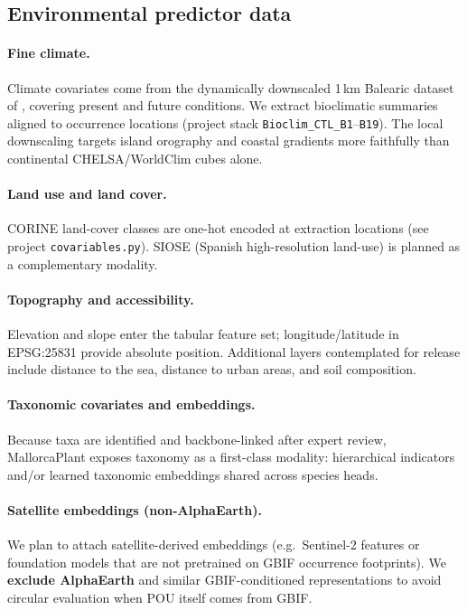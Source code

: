 \documentclass[11pt,letterpaper]{article}
\begin{document}
\subsection{Environmental predictor data}
\label{sec:predictors}

\paragraph{Fine climate.}
Climate covariates come from the dynamically downscaled 1\,km Balearic dataset of \citet{bahuet2026}, covering present and future conditions.
We extract bioclimatic summaries aligned to occurrence locations (project stack \texttt{Bioclim\_CTL\_B1}--\texttt{B19}).
The local downscaling targets island orography and coastal gradients more faithfully than continental CHELSA/WorldClim cubes alone.

\paragraph{Land use and land cover.}
CORINE land-cover classes are one-hot encoded at extraction locations (see project \texttt{covariables.py}).
SIOSE (Spanish high-resolution land-use) is planned as a complementary modality.

\paragraph{Topography and accessibility.}
Elevation and slope enter the tabular feature set; longitude/latitude in EPSG:25831 provide absolute position.
Additional layers contemplated for release include distance to the sea, distance to urban areas, and soil composition.

\paragraph{Taxonomic covariates and embeddings.}
Because taxa are identified and backbone-linked after expert review, MallorcaPlant exposes taxonomy as a first-class modality: hierarchical indicators and/or learned taxonomic embeddings shared across species heads.

\paragraph{Satellite embeddings (non-AlphaEarth).}
We plan to attach satellite-derived embeddings (e.g.\ Sentinel-2 features or foundation models that are not pretrained on GBIF occurrence footprints).
We \textbf{exclude AlphaEarth} and similar GBIF-conditioned representations to avoid circular evaluation when POU itself comes from GBIF.
\end{document}
